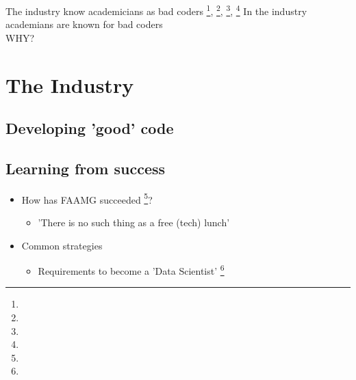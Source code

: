 \documentclass[usenames,dvipsnames]{beamer}
\theoremstyle{plain}
\theoremstyle{definition}
\begin{document}
\begin{frame}{\setframetitle{}}
{
\centering \large The industry know academicians as bad
coders \footnote{}, \footnote{}, \footnote{}, \footnote{}
}
{
\centering \large In the industry academians are known for bad coders
\\
\Huge \color{my_raspberry} WHY?
}
\end{frame}


\section{The Industry}

\subsection{Developing 'good' code}
\begin{frame}{\setframetitle{}}
  {
\begin{figure}
{}
 \end{figure}
 }
 \end{frame}



\subsection{Learning from success}




\begin{frame}{\setframetitle{}}

\begin{itemize}

\item How has FAAMG  succeeded \footnote{}?
\begin{itemize}
\item 'There is no such thing as a free (tech) lunch'
\end{itemize}
\item Common strategies
\begin{itemize}
\item Requirements to become a 'Data Scientist' \footnote{}
\end{itemize}

\end{itemize}
\end{frame}
\end{document}

